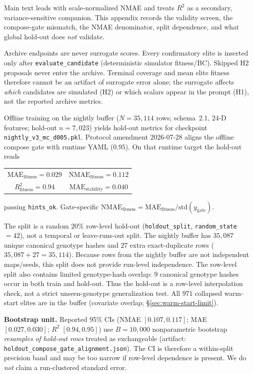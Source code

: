 \documentclass[preprint,12pt]{elsarticle}
\begin{document}
Main text leads with scale-normalized NMAE and treats $R^{2}$ as a secondary, variance-sensitive companion. This appendix records the validity screen, the compose-gate mismatch, the NMAE denominator, split dependence, and what global hold-out does \emph{not} validate.

Archive endpoints are never surrogate scores.
Every confirmatory elite is inserted only after \texttt{evaluate\_candidate} (deterministic simulator fitness/BC). Skipped H2 proposals never enter the archive. Terminal coverage and mean elite fitness therefore cannot be an artifact of surrogate error alone; the surrogate affects \emph{which} candidates are simulated (H2) or which scalars appear in the prompt (H1), not the reported archive metrics.

Offline training on the nightly buffer ($N=35{,}114$ rows; schema~2.1, 24-D features; hold-out $n{=}7{,}023$) yields hold-out metrics for checkpoint \texttt{nightly\_v3\_mc\_d005.pkl}. Protocol amendment 2026-07-28 aligns the offline compose gate with runtime YAML ($0.95$). On that runtime target the hold-out reads
\begin{center}
\begin{tabular}{@{}c@{\qquad}c@{}}
$\mathrm{MAE}_{\mathrm{fitness}}=0.029$ & $\mathrm{NMAE}_{\mathrm{fitness}}=0.112$ \\[0.4em]
$R^{2}_{\mathrm{fitness}}=0.94$ & $\mathrm{MAE}_{\mathrm{stability}}=0.040$
\end{tabular}
\end{center}
passing \texttt{hints\_ok}. Gate-specific $\mathrm{NMAE}_{\mathrm{fitness}}=\mathrm{MAE}_{\mathrm{fitness}}/\mathrm{std}(y_{\mathrm{gate}})$.

The split is a random $20\%$ row-level hold-out (\texttt{holdout\_split}, \texttt{random\_state}$=42$), not a temporal or leave-runs-out split. The nightly buffer has $35{,}087$ unique canonical genotype hashes and $27$ extra exact-duplicate rows ($35{,}087+27=35{,}114$). Because rows from the nightly buffer are not independent maps/seeds, this split does not provide run-level independence. The row-level split also contains limited genotype-hash overlap: $9$ canonical genotype hashes occur in both train and hold-out. Thus the hold-out is a row-level interpolation check, not a strict unseen-genotype generalization test. All $971$ collapsed warm-start elites are in the buffer (covariate overlap; \S\ref{sec:warm-start-limit}).

\textbf{Bootstrap unit.} Reported 95\% CIs (NMAE $[0.107,0.117]$; MAE $[0.027,0.030]$; $R^{2}$ $[0.94,0.95]$) use $B{=}10{,}000$ nonparametric bootstrap \emph{resamples of hold-out rows} treated as exchangeable (artifact: \texttt{holdout\_compose\_gate\_alignment.json}). The CI is therefore a within-split precision band and may be too narrow if row-level dependence is present. We do \emph{not} claim a run-clustered standard error.
\end{document}
